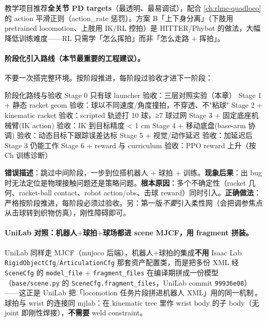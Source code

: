 教学项目推荐\textbf{全关节 PD targets}（最透明、最易调试），配合 \cref{ch:rlmc-quadloco} 的 action 平滑正则（action\_rate 惩罚）。方案 B「上下身分离」（下肢用 pretrained locomotion、上肢用 IK/RL 控拍）是 HITTER/Phybot 的做法，大幅降低训练难度——RL 只需学「怎么挥拍」而非「怎么走路 $+$ 挥拍」。

\paragraph{阶段化引入路线（本节最重要的工程建议）。}不要一次搭完整环境。按阶段推进，每阶段过验收才进下一阶段：

\begin{codebox}[text]{阶段化路线与验收}
Stage 0  只有球 launcher              验收：三层对照实验（本章）
Stage 1  + 静态 racket geom          验收：球以不同速度/角度撞拍，不穿透、不"粘球"
Stage 2  + kinematic racket          验收：scripted 轨迹打 10 球，≥7 球过网
Stage 3  + 固定底座机械臂(IK action) 验收：IK 到目标精度 < 1 cm
Stage 4  + 移动底盘(base-arm 协调)    验收：动态目标下跟踪误差达标
Stage 5  + 视觉/动作延迟             验收：加延迟后 Stage 3 仍能工作
Stage 6  + reward 与 curriculum      验收：PPO reward 上升（按 Ch 训练诊断）
\end{codebox}

\begin{pitfall}
\textbf{错误描述}：跳过中间阶段，一步到位搭机器人 $+$ 球拍 $+$ 训练。\textbf{现象后果}：出 bug 时无法定位是物理接触问题还是策略问题。\textbf{根本原因}：多个不确定性（racket 几何、racket-ball contact、robot action/obs、击球 reward）同时引入。\textbf{正确做法}：严格按阶段推进，每阶段必须过验收。另：第一版\emph{不要}引入柔性网（会把调参焦点从击球转到织物仿真），刚性障碍即可。
\end{pitfall}

\paragraph{UniLab 对照：机器人$+$球拍$+$球场都进 scene MJCF，用 fragment 拼装。}UniLab 同样走 MJCF（mujoco 后端），机器人$+$球拍的集成\textbf{不用} Isaac Lab \verb|RigidObjectCfg|/\verb|ArticulationCfg| 那套资产配置类，而是把多份 XML 经 \verb|SceneCfg| 的 \verb|model_file| $+$ \verb|fragment_files| 在编译期拼成一份模型（\verb|base/scene.py| 的 \verb|SceneCfg.fragment_files|，UniLab commit \texttt{99936e08}）——这正是 UniLab 把「locomotion 任务片段拼进机器人 XML」用的同一机制\,\cite{unilab2026}。球拍与 wrist 的连接同 mjlab：在 kinematic tree 里作 wrist body 的子 body（无 joint 即刚性焊接），\textbf{不需要} weld constraint。

